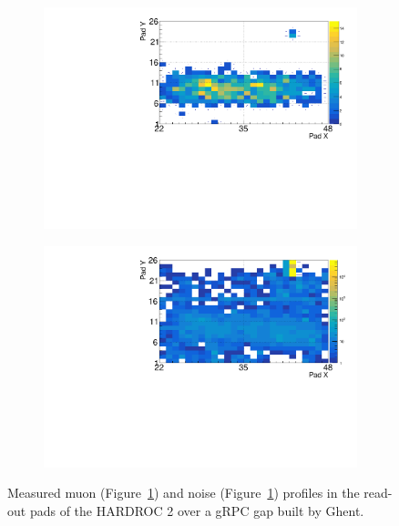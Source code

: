 	\begin{figure}[H]
		\begin{subfigure}{.5\linewidth}
		    \centering
			\includegraphics[width = \linewidth]{fig/chapt6/Muon-Profile-gRPC-HARDROC.pdf}
			\caption{\label{fig:HARDROC2-gRPC-profiles:A}}
		\end{subfigure}
		\begin{subfigure}{.5\linewidth}
		    \centering
			\includegraphics[width = \linewidth]{fig/chapt6/Noise-Profile-gRPC-HARDROC.pdf}
			\caption{\label{fig:HARDROC2-gRPC-profiles:B}}
		\end{subfigure}
		\caption{\label{fig:HARDROC2-gRPC-profiles} Measured muon (Figure~\ref{fig:HARDROC2-gRPC-profiles:A}) and noise (Figure~\ref{fig:HARDROC2-gRPC-profiles:A}) profiles in the read-out pads of the HARDROC 2 over a gRPC gap built by Ghent.}
    \end{figure}
    
